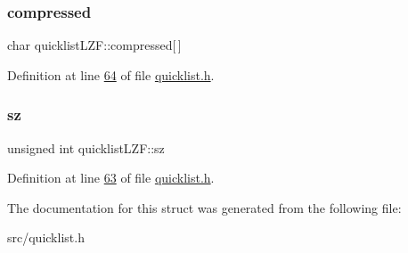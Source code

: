 \subsubsection{\texorpdfstring{compressed}{compressed}}
{\footnotesize\ttfamily char quicklist\+L\+Z\+F\+::compressed\mbox{[}$\,$\mbox{]}}



Definition at line \hyperlink{quicklist_8h_source_l00064}{64} of file \hyperlink{quicklist_8h_source}{quicklist.\+h}.

\mbox{\label{structquicklistLZF_a5c9d6d2c3740bd02019484d4978245f5}} 
\subsubsection{\texorpdfstring{sz}{sz}}
{\footnotesize\ttfamily unsigned int quicklist\+L\+Z\+F\+::sz}



Definition at line \hyperlink{quicklist_8h_source_l00063}{63} of file \hyperlink{quicklist_8h_source}{quicklist.\+h}.



The documentation for this struct was generated from the following file\+:\begin{DoxyCompactItemize}
\item 
src/quicklist.\+h\end{DoxyCompactItemize}
